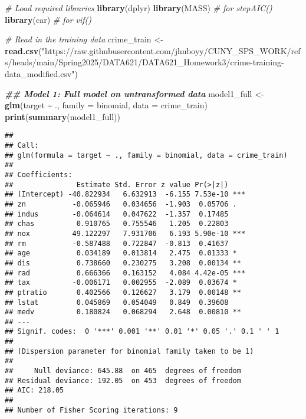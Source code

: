 \documentclass[
]{article}
\newenvironment{Shaded}{\begin{snugshade}}{\end{snugshade}}
\newcommand{\AttributeTok}[1]{\textcolor[rgb]{0.13,0.29,0.53}{#1}}
\newcommand{\CommentTok}[1]{\textcolor[rgb]{0.56,0.35,0.01}{\textit{#1}}}
\newcommand{\DocumentationTok}[1]{\textcolor[rgb]{0.56,0.35,0.01}{\textbf{\textit{#1}}}}
\newcommand{\FunctionTok}[1]{\textcolor[rgb]{0.13,0.29,0.53}{\textbf{#1}}}
\newcommand{\NormalTok}[1]{#1}
\newcommand{\OtherTok}[1]{\textcolor[rgb]{0.56,0.35,0.01}{#1}}
\newcommand{\SpecialCharTok}[1]{\textcolor[rgb]{0.81,0.36,0.00}{\textbf{#1}}}
\newcommand{\StringTok}[1]{\textcolor[rgb]{0.31,0.60,0.02}{#1}}
\begin{document}
\begin{Shaded}
\begin{Highlighting}[]
\CommentTok{\# Load required libraries}
\FunctionTok{library}\NormalTok{(dplyr)}
\FunctionTok{library}\NormalTok{(MASS)   }\CommentTok{\# for stepAIC()}
\FunctionTok{library}\NormalTok{(car)    }\CommentTok{\# for vif()}

\CommentTok{\# Read in the training data}
\NormalTok{crime\_train }\OtherTok{\textless{}{-}} \FunctionTok{read.csv}\NormalTok{(}\StringTok{"https://raw.githubusercontent.com/jhnboyy/CUNY\_SPS\_WORK/refs/heads/main/Spring2025/DATA621/DATA621\_Homework3/crime{-}training{-}data\_modified.csv"}\NormalTok{)}

\DocumentationTok{\#\# Model 1: Full model on untransformed data}
\NormalTok{model1\_full }\OtherTok{\textless{}{-}} \FunctionTok{glm}\NormalTok{(target }\SpecialCharTok{\textasciitilde{}}\NormalTok{ ., }\AttributeTok{family =}\NormalTok{ binomial, }\AttributeTok{data =}\NormalTok{ crime\_train)}
\FunctionTok{print}\NormalTok{(}\FunctionTok{summary}\NormalTok{(model1\_full))}
\end{Highlighting}
\end{Shaded}

\begin{verbatim}
## 
## Call:
## glm(formula = target ~ ., family = binomial, data = crime_train)
## 
## Coefficients:
##               Estimate Std. Error z value Pr(>|z|)    
## (Intercept) -40.822934   6.632913  -6.155 7.53e-10 ***
## zn           -0.065946   0.034656  -1.903  0.05706 .  
## indus        -0.064614   0.047622  -1.357  0.17485    
## chas          0.910765   0.755546   1.205  0.22803    
## nox          49.122297   7.931706   6.193 5.90e-10 ***
## rm           -0.587488   0.722847  -0.813  0.41637    
## age           0.034189   0.013814   2.475  0.01333 *  
## dis           0.738660   0.230275   3.208  0.00134 ** 
## rad           0.666366   0.163152   4.084 4.42e-05 ***
## tax          -0.006171   0.002955  -2.089  0.03674 *  
## ptratio       0.402566   0.126627   3.179  0.00148 ** 
## lstat         0.045869   0.054049   0.849  0.39608    
## medv          0.180824   0.068294   2.648  0.00810 ** 
## ---
## Signif. codes:  0 '***' 0.001 '**' 0.01 '*' 0.05 '.' 0.1 ' ' 1
## 
## (Dispersion parameter for binomial family taken to be 1)
## 
##     Null deviance: 645.88  on 465  degrees of freedom
## Residual deviance: 192.05  on 453  degrees of freedom
## AIC: 218.05
## 
## Number of Fisher Scoring iterations: 9
\end{verbatim}
\end{document}
